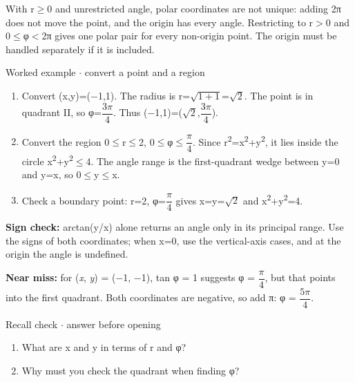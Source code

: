 \documentclass[11pt]{article}
\begin{document}
\begin{keepsection}
With r\ensuremath{\geq}0 and unrestricted angle, polar coordinates are not unique: adding 2π does not move the point, and the origin has every angle. Restricting to r\ensuremath{>}0 and 0\ensuremath{\leq}φ\ensuremath{<}2π gives one polar pair for every non-origin point. The origin must be handled separately if it is included.

\begin{workedbox}{Worked example \ensuremath{\cdot} convert a point and a region}
\begin{enumerate}
\item Convert (x,y)=(\ensuremath{-}1,1). The radius is r=\ensuremath{\sqrt{1+1}}=\ensuremath{\sqrt{2}}. The point is in quadrant II, so φ={\small\ensuremath{\dfrac{3π}{4}}}. Thus (\ensuremath{-}1,1)=(\ensuremath{\sqrt{2}},{\small\ensuremath{\dfrac{3π}{4}}}).
\item Convert the region 0\ensuremath{\leq}r\ensuremath{\leq}2, 0\ensuremath{\leq}φ\ensuremath{\leq}{\small\ensuremath{\dfrac{π}{4}}}. Since r\textsuperscript{2}=x\textsuperscript{2}+y\textsuperscript{2}, it lies inside the circle x\textsuperscript{2}+y\textsuperscript{2}\ensuremath{\leq}4. The angle range is the first-quadrant wedge between y=0 and y=x, so 0\ensuremath{\leq}y\ensuremath{\leq}x.
\item Check a boundary point: r=2, φ={\small\ensuremath{\dfrac{π}{4}}} gives x=y=\ensuremath{\sqrt{2}} and x\textsuperscript{2}+y\textsuperscript{2}=4.
\end{enumerate}
\end{workedbox}

\begin{notebox}\textbf{Sign check:} arctan(y/x) alone returns an angle only in its principal range. Use the signs of both coordinates; when x=0, use the vertical-axis cases, and at the origin the angle is undefined.\end{notebox}

\begin{notebox}\textbf{Near miss:} for (\textit{x}, \textit{y}) = (\ensuremath{-}1, \ensuremath{-}1), tan φ = 1 suggests φ = {\small\ensuremath{\dfrac{π}{4}}}, but that points into the first quadrant. Both coordinates are negative, so add π: φ = {\small\ensuremath{\dfrac{5π}{4}}}.\end{notebox}

\begin{recallbox}{Recall check \ensuremath{\cdot} answer before opening}
\begin{enumerate}
\item What are x and y in terms of r and φ?
\item Why must you check the quadrant when finding φ?
\end{enumerate}

\end{recallbox}
\end{keepsection}
\end{document}
